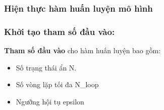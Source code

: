 \subsubsection{Hiện thực hàm huấn luyện mô hình}

\subsubsection*{Khởi tạo tham số đầu vào:}

\textbf{Tham số đầu vào} cho hàm huấn luyện bao gồm:
\begin{itemize}
    \item Số trạng thái ẩn N.
    \item Số vòng lặp tối đa N\_loop
    \item Ngưỡng hội tụ epsilon
\end{itemize}

